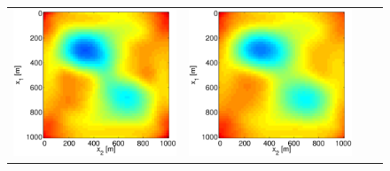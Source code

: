 \documentclass{iopart}
\begin{document}
\begin{figure}
\begin{tabular}{cccc}
\includegraphics[scale=.2]{./figs/2D_exp2_e}&
\includegraphics[scale=.2]{./figs/2D_exp2_f}&

\end{tabular}
\end{figure}
\end{document}

